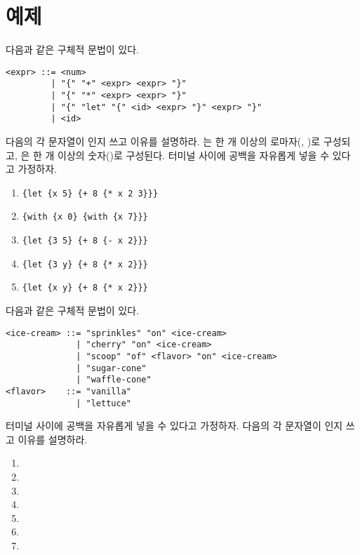 \section{예제}

\begin{exercise}

다음과 같은 구체적 문법이 있다.

\begin{verbatim}
<expr> ::= <num>
         | "{" "+" <expr> <expr> "}"
         | "{" "*" <expr> <expr> "}"
         | "{" "let" "{" <id> <expr> "}" <expr> "}"
         | <id>
\end{verbatim}

다음의 각 문자열이 인지 쓰고 이유를 설명하라.
는 한 개 이상의 로마자(, )로 구성되고,
은 한 개 이상의 숫자()로 구성된다.
터미널 사이에 공백을 자유롭게 넣을 수 있다고 가정하자.

\begin{enumerate}
  \item \verb!{let {x 5} {+ 8 {* x 2 3}}}!
  \item \verb!{with {x 0} {with {x 7}}}!
  \item \verb!{let {3 5} {+ 8 {- x 2}}}!
  \item \verb!{let {3 y} {+ 8 {* x 2}}}!
  \item \verb!{let {x y} {+ 8 {* x 2}}}!
\end{enumerate}

\end{exercise}

\begin{exercise}

다음과 같은 구체적 문법이 있다.

\begin{verbatim}
<ice-cream> ::= "sprinkles" "on" <ice-cream>
              | "cherry" "on" <ice-cream>
              | "scoop" "of" <flavor> "on" <ice-cream>
              | "sugar-cone"
              | "waffle-cone"
<flavor>    ::= "vanilla"
              | "lettuce"
\end{verbatim}

터미널 사이에 공백을 자유롭게 넣을 수 있다고 가정하자.
다음의 각 문자열이 인지 쓰고 이유를 설명하라.

\begin{enumerate}
  \item {}
  \item {}
  \item {}
  \item {}
  \item {}
  \item {}
  \item {}
\end{enumerate}

\end{exercise}

